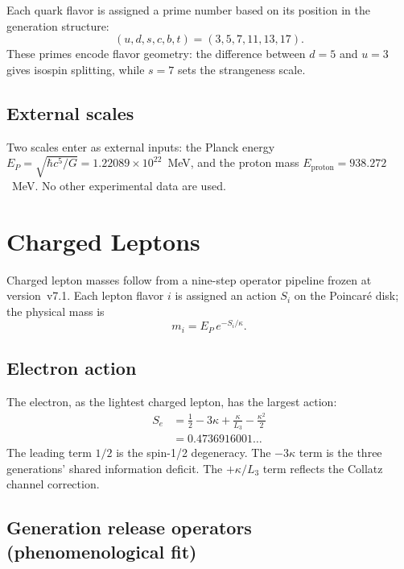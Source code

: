 \documentclass[aps,prd,reprint,twocolumn,showpacs,superscriptaddress]{revtex4-2}
\begin{document}
Each quark flavor is assigned a prime number based on its position in the
generation structure:
\begin{equation}
(u,d,s,c,b,t) = (3,5,7,11,13,17).
\end{equation}
These primes encode flavor geometry: the difference between
$d = 5$ and $u = 3$ gives isospin splitting, while $s = 7$ sets the
strangeness scale.

\subsection{External scales}

Two scales enter as external inputs: the Planck energy
$E_P = \sqrt{\hbar c^5 / G} = 1.22089 \times 10^{22}$~MeV, and the
proton mass $E_{\text{proton}} = 938.272$~MeV.  No other experimental
data are used.

\section{Charged Leptons}
\label{sec:leptons}

Charged lepton masses follow from a nine-step operator pipeline frozen
at version~v7.1.  Each lepton flavor $i$ is assigned an action
$S_i$ on the Poincar\'{e} disk; the physical mass is
\begin{equation}
m_i = E_P \, e^{-S_i / \kappa}.
\label{eq:mass_from_action}
\end{equation}

\subsection{Electron action}

The electron, as the lightest charged lepton, has the largest action:
\begin{align}
S_e &= \frac12 - 3\kappa + \frac{\kappa}{L_3} - \frac{\kappa^2}{2} \\
    &= 0.4736916001 \ldots
\label{eq:S_e}
\end{align}
The leading term $1/2$ is the spin-1/2 degeneracy.  The $-3\kappa$ term
is the three generations' shared information deficit.  The
$+\kappa/L_3$ term reflects the Collatz channel correction.

\subsection{Generation release operators (phenomenological fit)}
\end{document}
